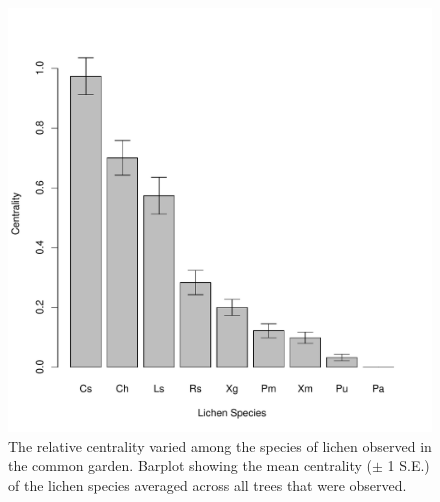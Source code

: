 \documentclass[11pt,onecolumn,lineno]{olplainarticle}
\begin{document}
\begin{figure}[ht]
\centering
\includegraphics[width=\linewidth]{spp_cen.pdf}
\caption{The relative centrality varied among the species of lichen
  observed in the common garden. Barplot showing the mean centrality
  ($\pm$ 1 S.E.) of the lichen species averaged across all trees that
  were observed.}
\label{fig:spp_cen}
\end{figure}
\end{document}

